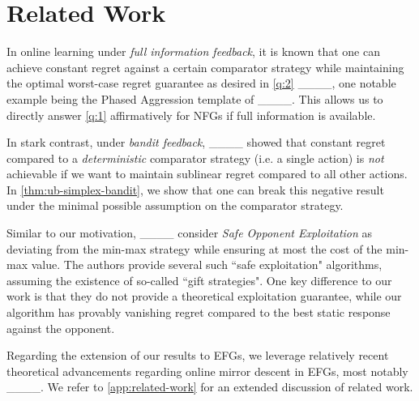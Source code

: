 \section{Related Work}
\label{sec:related-work}

In online learning under \emph{full information feedback}, it is known that one can achieve constant regret against a certain comparator strategy while maintaining the optimal worst-case regret guarantee as desired in \cref{q:2} ____, one notable example being the Phased Aggression template of ____. This allows us to directly answer \cref{q:1} affirmatively for NFGs if full information is available.

In stark contrast, under \textit{bandit feedback}, ____ showed that constant regret compared to a \emph{deterministic} comparator strategy (i.e. a single action) is \emph{not} achievable if we want to maintain sublinear regret compared to all other actions. In \cref{thm:ub-simplex-bandit}, we show that one can break this negative result under the minimal possible assumption on the comparator strategy.

Similar to our motivation, ____ consider \emph{Safe Opponent Exploitation} as deviating from the min-max strategy while ensuring at most the cost of the min-max value. The authors provide several such ``safe exploitation" algorithms, assuming the existence of so-called ``gift strategies". One key difference to our work is that they do not provide a theoretical exploitation guarantee, while our algorithm has provably vanishing regret compared to the best static response against the opponent. 

Regarding the extension of our results to EFGs, we leverage relatively recent theoretical advancements regarding online mirror descent in EFGs, most notably ____. We refer to \cref{app:related-work} for an extended discussion of related work.